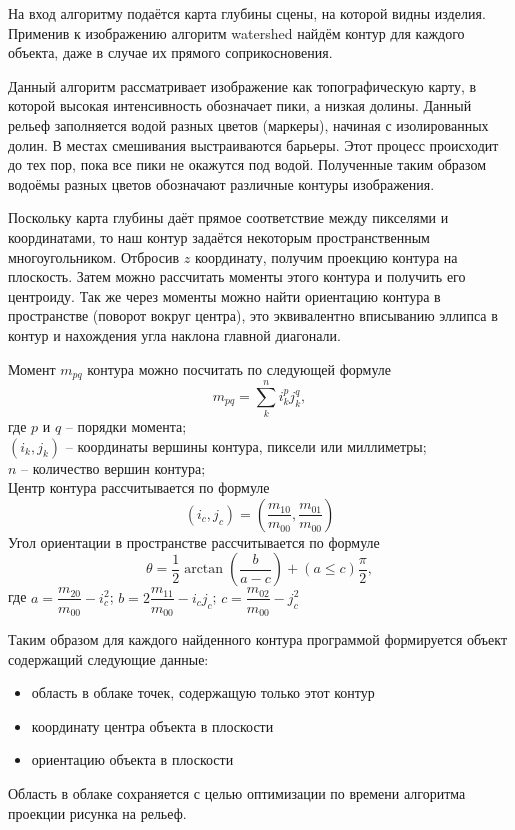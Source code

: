         На вход алгоритму подаётся карта глубины сцены, на которой видны изделия. Применив к изображению алгоритм watershed найдём контур для каждого объекта, даже в случае их прямого соприкосновения. 
        
        Данный алгоритм рассматривает изображение как топографическую карту, в которой высокая интенсивность обозначает пики, а низкая долины. Данный рельеф заполняется водой разных цветов (маркеры), начиная с изолированных долин. В местах смешивания выстраиваются барьеры. Этот процесс происходит до тех пор, пока все пики не окажутся под водой. Полученные таким образом водоёмы разных цветов обозначают различные контуры изображения\cite{opencvWATERSHED}.
        
        Поскольку карта глубины даёт прямое соответствие между пикселями и координатами, то наш контур задаётся некоторым пространственным многоугольником. Отбросив $ z $ координату, получим проекцию контура на плоскость. Затем можно рассчитать моменты этого контура и получить его центроиду. Так же через моменты можно найти ориентацию контура в пространстве (поворот вокруг центра), это эквивалентно вписыванию эллипса в контур и нахождения угла наклона главной диагонали.
        
        Момент $ m_{pq} $ контура можно посчитать по следующей формуле
        \begin{equation}
            m_{pq} = \sum\limits_{k}^{n}i_k^p j_k^q,
        \end{equation}
        где $ p $ и $ q $ -- порядки момента;\\
        $ \left(i_k, j_k\right) $ -- координаты вершины контура, пиксели или миллиметры;\\
        $ n $ -- количество вершин контура;\\
        Центр контура рассчитывается по формуле
        \begin{equation}
            (i_c,j_c) = \left(\dfrac{m_{10}}{m_{00}}, \dfrac{m_{01}}{m_{00}}\right)
        \end{equation}
        Угол ориентации в пространстве рассчитывается по формуле
        \begin{equation}
            \theta = \dfrac{1}{2}\arctan\left(\dfrac{b}{a-c}\right) + \left(a\le c\right)\dfrac{\pi}{2},
        \end{equation}
        где $ a = \dfrac{m_{20}}{m_{00}} - i_c^2 $; 
        $ b = 2\dfrac{m_{11}}{m_{00}} - i_cj_c $; 
        $ c = \dfrac{m_{02}}{m_{00}} - j_c^2 $
        
        Таким образом для каждого найденного контура программой формируется объект содержащий следующие данные:
        \begin{itemize}
            \item область в облаке точек, содержащую только этот контур
            \item координату центра объекта в плоскости
            \item ориентацию объекта в плоскости
        \end{itemize}
        Область в облаке сохраняется с целью оптимизации по времени алгоритма проекции рисунка на рельеф.
        
